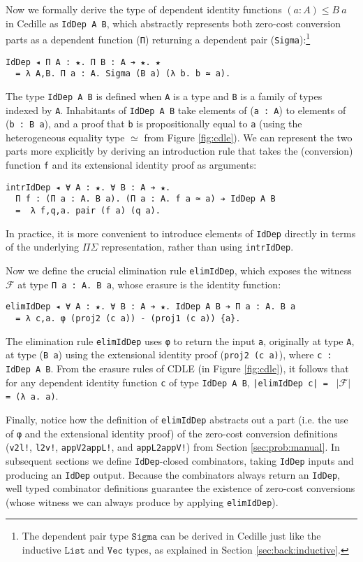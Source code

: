 \documentclass[acmsmall]{acmart}\settopmatter{}
\newcommand{\refsec}[1]{Section \ref{sec:#1}}
\newcommand{\reffig}[1]{Figure \ref{fig:#1}}
\newcommand{\txt}[1]{\ensuremath{\texttt{#1}}}
\begin{document}
Now we formally derive the type of dependent identity functions $(a :
A) \leq B~a$ in Cedille as \verb;IdDep A B;,
which abstractly represents both zero-cost conversion
parts as a dependent function (\verb;Π;) returning a dependent pair
(\verb;Sigma;):\footnote{
  The dependent pair type \txt{Sigma} can be derived in Cedille just
  like the inductive \txt{List} and \txt{Vec} types, as explained in
  \refsec{back:inductive}.
  }
\begin{verbatim}
IdDep ◂ Π A : ★. Π B : A ➔ ★. ★
  = λ A,B. Π a : A. Sigma (B a) (λ b. b ≃ a).
\end{verbatim}
The type \verb;IdDep A B; is defined when \verb;A; is a type and
\verb;B; is a family of types indexed by \verb;A;. Inhabitants of
\verb;IdDep A B; take elements of (\verb;a : A;) to elements of
(\verb;b : B a;), and a proof that \verb;b; is propositionally equal
to \verb;a; (using the heterogeneous equality type
$\simeq$
from \reffig{cdle}).
We can represent the two parts more explicitly by deriving
an introduction rule that takes the (conversion) function \verb;f; and
its extensional identity proof as arguments:
\begin{verbatim}
intrIdDep ◂ ∀ A : ★. ∀ B : A ➔ ★. 
  Π f : (Π a : A. B a). (Π a : A. f a ≃ a) ➔ IdDep A B 
  =  λ f,q,a. pair (f a) (q a).
\end{verbatim}
In practice, it is more convenient to introduce elements of
\verb;IdDep; directly in terms of the underlying $\Pi\Sigma$
representation, rather than using \verb;intrIdDep;.

Now we define the crucial elimination rule \verb;elimIdDep;, which exposes
the witness $\mathcal{F}$ at type \verb;Π a : A. B a;, whose erasure
is the identity function:
\begin{verbatim}
elimIdDep ◂ ∀ A : ★. ∀ B : A ➔ ★. IdDep A B ➔ Π a : A. B a
  = λ c,a. φ (proj2 (c a)) - (proj1 (c a)) {a}.
\end{verbatim}
The elimination rule \verb;elimIdDep; uses \verb;φ; to return the input
\verb;a;, originally at type \verb;A;, at type (\verb;B a;) using the
extensional identity proof (\verb;proj2 (c a);), where \verb;c : IdDep A B;.
From the erasure rules of CDLE (in \reffig{cdle}), it follows
that for any dependent identity function \verb;c; of type \verb;IdDep A B;,
\verb;|elimIdDep c| = ; $|\mathcal{F}|$ \verb; = (λ a. a);.

Finally, notice how the definition of
\verb;elimIdDep; abstracts out a part (i.e. the use of \verb;φ; and the
extensional identity proof) of the zero-cost
conversion definitions (\verb;v2l!;, \verb;l2v!;, \verb;appV2appL!;, and
\verb;appL2appV!;) from \refsec{prob:manual}. In subsequent sections
we define \verb;IdDep;-closed combinators, taking \verb;IdDep; inputs
and producing an \verb;IdDep; output. Because the combinators always
return an \verb;IdDep;, well typed combinator definitions guarantee
the existence of zero-cost conversions
(whose witness we can always produce by applying \verb;elimIdDep;).
\end{document}
